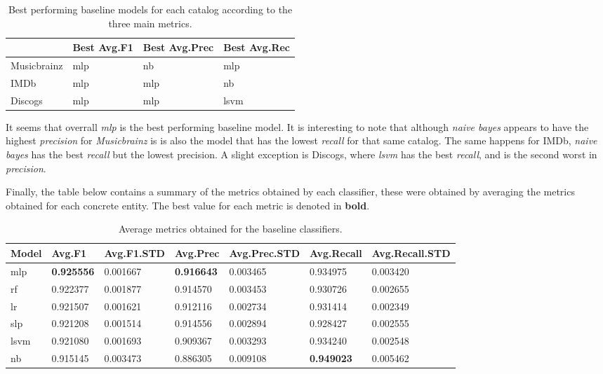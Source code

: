 \documentclass[epsfig,a4paper,11pt,titlepage,twoside,openany]{book}
\begin{document}
\begin{table}[H]
\centering
\begin{tabular}{l|l|l|l}
                                  & Best Avg.F1 & Best Avg.Prec & Best Avg.Rec \\ \hline
\multicolumn{1}{l|}{Musicbrainz} & mlp    & nb       & mlp     \\ \hline
\multicolumn{1}{l|}{IMDb}        & mlp    & mlp      & nb      \\ \hline
\multicolumn{1}{l|}{Discogs}     & mlp    & mlp      & lsvm    \\ 
\end{tabular}
\caption{Best performing baseline models for each catalog according to the three main metrics.}
\label{tab:best-model-per-metric-average}
\end{table}

It seems that overrall \textit{mlp} is the best performing baseline model. It is interesting to note that although \textit{naive bayes} appears to have the highest \textit{precision} for \textit{Musicbrainz} is is also the model that has the lowest \textit{recall} for that same catalog. The same happens for IMDb, \textit{naive bayes} has the best \textit{recall} but the lowest precision. A slight exception is Discogs, where \textit{lsvm} has the best \textit{recall}, and is the second worst in \textit{precision}.

Finally, the table below contains a summary of the metrics obtained by each classifier, these were obtained by averaging the metrics obtained for each concrete entity. The best value for each metric is denoted in \textbf{bold}.

\begin{table}[H]
\centering
\begin{tabular}{l|l|l|l|l|l|l}
Model & Avg.F1   & Avg.F1.STD & Avg.Prec & Avg.Prec.STD & Avg.Recall & Avg.Recall.STD \\ \hline
mlp   & \textbf{0.925556} & 0.001667   & \textbf{0.916643} & 0.003465     & 0.934975   & 0.003420       \\
rf    & 0.922377 & 0.001877   & 0.914570 & 0.003453     & 0.930726   & 0.002655       \\
lr    & 0.921507 & 0.001621   & 0.912116 & 0.002734     & 0.931414   & 0.002349       \\
slp   & 0.921208 & 0.001514   & 0.914556 & 0.002894     & 0.928427   & 0.002555       \\
lsvm  & 0.921080 & 0.001693   & 0.909367 & 0.003293     & 0.934240   & 0.002548       \\
nb    & 0.915145 & 0.003473   & 0.886305 & 0.009108     & \textbf{0.949023}   & 0.005462          
\end{tabular}
\caption{Average metrics obtained for the baseline classifiers.}
\label{tab:metrics-summary-baseline}
\end{table}
\end{document}
